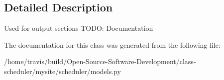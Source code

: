 \subsection{Detailed Description}
\begin{DoxyVerb}    Used for output sections
    TODO:
        Documentation
\end{DoxyVerb}
 

The documentation for this class was generated from the following file\-:\begin{DoxyCompactItemize}
\item 
/home/travis/build/\-Open-\/\-Source-\/\-Software-\/\-Development/class-\/scheduler/mysite/scheduler/models.\-py\end{DoxyCompactItemize}
